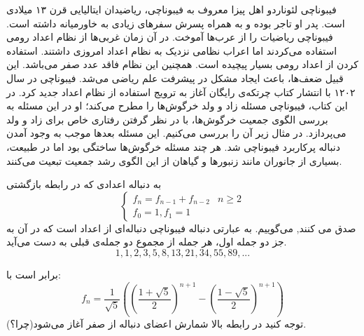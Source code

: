 \begin{EXTRA}{ فیبوناچی }
\p
لئوناردو اهل پیزا
معروف به
فیبوناچی،
 ریاضیدان ایتالیایی قرن 
۱۳
میلادی
است.
پدر او تاجر بوده و به همراه پسرش سفرهای زیادی به خاورمیانه داشته است.
فیبوناچی ریاضیات را از عرب‌ها آموخت.
در آن زمان غربی‌ها از نظام اعداد رومی استفاده می‌کردند اما اعراب نظامی نزدیک به نظام اعداد امروزی داشتند.
استفاده کردن از اعداد رومی بسیار پیچیده‌ است. همچنین این نظام فاقد عدد صفر می‌باشد. این قبیل ضعف‌ها، باعث ایجاد مشکل در پیشرفت علم ریاضی می‌شد.
فیبوناچی در سال ۱۲۰۲ با انتشار کتاب
چرتکه‌ی رایگان
آغاز به
ترویج استفاده از نظام اعداد جدید کرد.
در این کتاب، فیبوناچی مسئله زاد و ولد خرگوش‌ها را مطرح می‌کند؛ او در این مسئله به بررسی الگوی جمعیت خرگوش‌ها، با در نظر گرفتن رفتاری خاص برای زاد و ولد می‌پردازد. در مثال زیر آن را بررسی می‌کنیم.
این مسئله بعدها  موجب به وجود آمدن دنباله پرکاربرد فیبوناچی شد.
هر چند مسئله خرگوش‌ها ساختگی بود اما در طبیعت، بسیاری از جانوران مانند زنبورها و گیاهان از این الگوی رشد جمعیت تبعیت می‌کنند.
\end{EXTRA}



\begin{DEFINITION}
  \p
    به دنباله اعدادی که در رابطه بازگشتی
  \[\begin{cases}
      f_{n}=f_{n-1} + f_{n-2} & n\geq 2 \\
      
      f_0=1 ,
      f_1 = 1
  \end{cases}
  \]
  صدق می کنند,
    می‌گوییم.
    به عبارتی دنباله فیبوناچی
    دنباله‌ای از اعداد است که در آن به جز دو جمله اول، هر جمله از مجموع دو جمله‌ی قبلی به دست می‌آید.
    \p
  $$1, 1, 2, 3, 5, 8, 13, 21, 34, 55, 89, ...$$
\end{DEFINITION}





\begin{THEOREM}
    \p
    برابر است با:
    $$f_n = \frac{1}{\sqrt{5}}((\frac{1 + \sqrt{5}}{2})^{n+1} - (\frac{1 - \sqrt{5}}{2})^{n+1})$$
    توجه کنید در رابطه بالا شمارش اعضای دنباله از صفر آغاز می‌شود(چرا؟).
\end{THEOREM}



